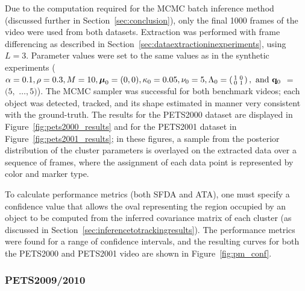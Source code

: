 \documentclass[twocolumn, final]{svjour3}
\begin{document}
Due to the computation required for the MCMC batch inference method (discussed further in Section~\ref{sec:conclusion}), only the final 1000 frames of the video were used from both datasets. Extraction was performed with frame differencing as described in Section~\ref{sec:dataextractioninexperiments}, using $L=3$. Parameter values were set to the same values as in the synthetic experiments ($\alpha = 0.1, \rho = 0.3, M = 10, \boldsymbol{\mu}_{0} = (0,0), \kappa_{0} = 0.05, \nu_{0} = 5, \Lambda_{0} = \left( \begin{smallmatrix} 1&0\\ 0&1 \end{smallmatrix} \right), \text{ and } \bold{q}_{0}$ $=$ $(5,$ $\ldots,5)$). The MCMC sampler was successful for both benchmark videos; each object was detected, tracked, and its shape estimated in manner very consistent with the ground-truth. The results for the PETS2000 dataset are displayed in Figure~\ref{fig:pets2000_results} and for the PETS2001 dataset in Figure~\ref{fig:pets2001_results}; in these figures, a sample from the posterior distribution of the cluster parameters is overlayed on the extracted data over a sequence of frames, where the assignment of each data point is represented by color and marker type.


To calculate performance metrics (both SFDA and ATA), one must specify a confidence value that allows the oval representing the region occupied by an object to be computed from the inferred covariance matrix of each cluster (as discussed in Section~\ref{sec:inferencetotrackingresults}). The performance metrics were found for a range of confidence intervals, and the resulting curves for both the PETS2000 and PETS2001 video are shown in Figure~\ref{fig:pm_conf}.



\subsubsection{PETS2009/2010}
\label{sec:pets20092010}
\end{document}
